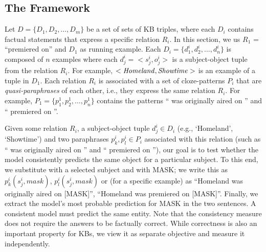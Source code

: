 \subsection{The Framework}
\label{sec:framework}
Let
$D = \{D_1, D_2,
\dots, D_m\}$
be a set of sets of KB triples,
where each $D_i$ contains factual statements
that express a specific relation $R_i$. In this section, we
us $R_1$ = ``premiered
on'' and $D_1$
as running example. Each $D_i=\{d_1^i,
d_2^i, \dots, d_n^i\}$
is composed of $n$ examples  where each $d_j^i = <s_j^i,o_j^i>$
is a subject-object tuple from the relation $R_i$. 
For example,
$<\text{\textit{Homeland}},
\text{\textit{Showtime}}>$
is an example of a 
tuple in $D_1$.
Each relation $R_i$ is associated with a set of
cloze-patterns $P_i$ that are \textit{quasi-paraphrases} of
each other, i.e., they express the same relation $R_i$. For example, $P_1=\{p_1^1, p_2^1, \dots, p_n^1\}$ contains the patterns ``\subj{} was originally aired on \obj{}'' and ``\subj{} premiered on \obj{}''.

Given some relation $R_i$, a subject-object tuple $d_j^i \in
D_i$ (e.g., `Homeland', `Showtime') and two paraphrases
$p_k^i, p_l^i \in P_i$ associated with this relation (such
as ``\subj{} was originally aired on \obj{}'' and ``\subj{}
premiered on \obj{}''), our goal is to test whether the
model consistently predicts the same object for a particular subject.
To this end, we
substitute \subj{} with a selected subject and \obj{} with
MASK; we write this as $p_k^i(s_j^i,mask)$,
$p_l^i(s_j^i,mask)$ or (for a specific example) as
``Homeland was originally aired on [MASK]'', ``Homeland was premiered on [MASK]''.
Finally, we extract the model's most probable prediction for
MASK in the two sentences.  A consistent model must predict the same entity. Note that the consistency measure does not require the answers to be factually correct. While correctness is also an important property for KBs, we view it as separate objective and measure it independently. 

